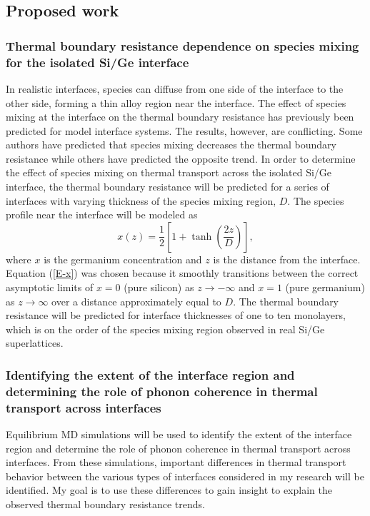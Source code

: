 \documentclass[letterpaper,12pt]{article}
\begin{document}
\subsection{\label{S-proposed-interfaces-proposed}Proposed work}

\subsubsection*{Thermal boundary resistance dependence on species
mixing for the isolated Si/Ge interface}

In realistic interfaces, species can diffuse from one side of the
interface to the other side, forming a thin alloy region near the
interface. The effect of species mixing at the interface on the
thermal boundary resistance has previously been predicted for model
interface systems.\cite{stevens2007,kechrakos1991,twu2003,daly2002}
The results, however, are conflicting. Some
authors\cite{stevens2007,kechrakos1991} have predicted that species
mixing decreases the thermal boundary resistance while
others\cite{twu2003,daly2002} have predicted the opposite trend. In
order to determine the effect of species mixing on thermal transport
across the isolated Si/Ge interface, the thermal boundary resistance
will be predicted for a series of interfaces with varying thickness
of the species mixing region, $D$. The species profile near the
interface will be modeled as
\begin{equation}
x(z) = \frac{1}{2}\left[1 + \tanh\left(\frac{2z}{D}\right)\right],
\label{E-x}
\end{equation}
where $x$ is the germanium concentration and $z$ is the distance
from the interface. Equation (\ref{E-x}) was chosen because it
smoothly transitions between the correct asymptotic limits of $x =
0$ (pure silicon) as $z \rightarrow -\infty$ and $x = 1$ (pure
germanium) as $z \rightarrow \infty$ over a distance approximately
equal to $D$. The thermal boundary resistance will be predicted for
interface thicknesses of one to ten monolayers, which is on the
order of the species mixing region observed in real Si/Ge
superlattices.\cite{soo2001}

\subsubsection*{Identifying the extent of the interface region and
determining the role of phonon coherence in thermal transport across
interfaces}

Equilibrium MD simulations will be used to identify the extent of
the interface region and determine the role of phonon coherence in
thermal transport across interfaces. From these simulations,
important differences in thermal transport behavior between the
various types of interfaces considered in my research will be
identified. My goal is to use these differences to gain insight to
explain the observed thermal boundary resistance trends.
\end{document}

